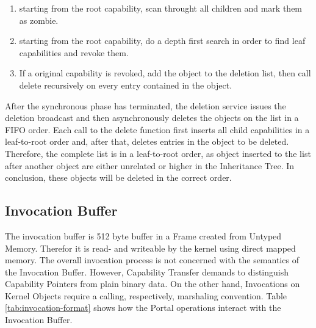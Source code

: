 \begin{enumerate}
\item starting from the root capability, scan throught all children and mark them as zombie.
\item starting from the root capability, do a depth first search in order to find leaf capabilities and revoke them.
\item If a original capability is revoked, add the object to the deletion list, then call delete recursively on every entry contained in the object.
\end{enumerate}

After the synchronous phase has terminated, the deletion service issues the deletion broadcast and then asynchronously deletes the objects on the list in a FIFO order. Each call to the delete function first inserts all child capabilities in a leaf-to-root order and, after that, deletes entries in the object to be deleted. Therefore, the complete list is in a leaf-to-root order, as object inserted to the list after another object are either unrelated or higher in the Inheritance Tree. In conclusion, these objects will be deleted in the correct order.

\subsection{Invocation Buffer}
\label{sec:invocation-format}

The invocation buffer is 512 byte buffer in a Frame created from Untyped Memory. Therefor it is read-  and writeable  by the kernel using direct mapped memory. The overall invocation process is not concerned with the semantics of the Invocation Buffer. However, Capability Transfer demands to distinguish Capability Pointers from plain binary data. On the other hand, Invocations on Kernel Objects require a calling, respectively, marshaling convention. Table \ref{tab:invocation-format} shows how the Portal operations interact with the Invocation Buffer.

